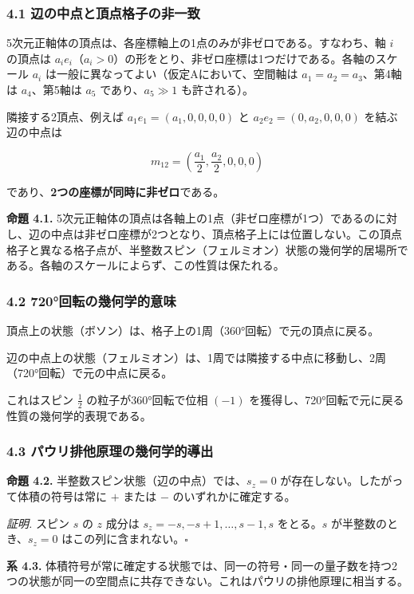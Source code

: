 \documentclass[a4paper,11pt]{ltjsarticle}
\begin{document}
\subsubsection*{4.1 辺の中点と頂点格子の非一致}

5次元正軸体の頂点は、各座標軸上の1点のみが非ゼロである。すなわち、軸 $i$ の頂点は $a_i e_i$（$a_i > 0$）の形をとり、非ゼロ座標は1つだけである。各軸のスケール $a_i$ は一般に異なってよい（仮定Aにおいて、空間軸は $a_1 = a_2 = a_3$、第4軸は $a_4$、第5軸は $a_5$ であり、$a_5 \gg 1$ も許される）。

隣接する2頂点、例えば $a_1 e_1 = (a_1, 0, 0, 0, 0)$ と $a_2 e_2 = (0, a_2, 0, 0, 0)$
を結ぶ辺の中点は

\[m_{12} = \left(\frac{a_1}{2}, \frac{a_2}{2}, 0, 0, 0\right)\]

であり、\textbf{2つの座標が同時に非ゼロ}である。

\textbf{命題 4.1.} 5次元正軸体の頂点は各軸上の1点（非ゼロ座標が1つ）であるのに対し、辺の中点は非ゼロ座標が2つとなり、頂点格子上には位置しない。この頂点格子と異なる格子点が、半整数スピン（フェルミオン）状態の幾何学的居場所である。各軸のスケールによらず、この性質は保たれる。

\subsubsection*{4.2 720°回転の幾何学的意味}

頂点上の状態（ボソン）は、格子上の1周（360°回転）で元の頂点に戻る。

辺の中点上の状態（フェルミオン）は、1周では隣接する中点に移動し、2周（720°回転）で元の中点に戻る。

これはスピン $\frac{1}{2}$ の粒子が360°回転で位相 $(-1)$
を獲得し、720°回転で元に戻る性質の幾何学的表現である。

\subsubsection*{4.3 パウリ排他原理の幾何学的導出}

\textbf{命題 4.2.} 半整数スピン状態（辺の中点）では、$s_z = 0$
が存在しない。したがって体積の符号は常に $+$ または $-$
のいずれかに確定する。

\emph{証明.} スピン $s$ の $z$ 成分は
$s_z = -s, -s+1, \ldots, s-1, s$ をとる。$s$
が半整数のとき、$s_z = 0$ はこの列に含まれない。$\square$

\textbf{系 4.3.}
体積符号が常に確定する状態では、同一の符号・同一の量子数を持つ2つの状態が同一の空間点に共存できない。これはパウリの排他原理に相当する。
\end{document}
